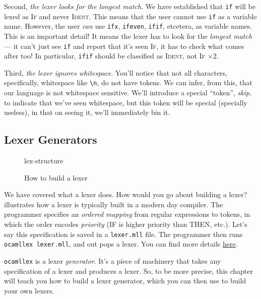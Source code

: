 Second, \emph{the lexer looks for the longest match}. We have established that \texttt{if} will be lexed as \textsc{If} and never \textsc{Ident}. This means that the user cannot use \texttt{if} as a variable name. However, the user \emph{can} use \texttt{ifx}, \texttt{ifeven}, \texttt{ifif}, etcetera, as variable names. This is an important detail! It means the lexer has to look for the \emph{longest match} --- it can't just see \texttt{if} and report that it's seen \textsc{If}, it has to check what comes after too! In particular, \texttt{ifif} should be classified as \textsc{Ident}, not \textsc{If} $\times 2$.

Third, \emph{the lexer ignores whitespace}. You'll notice that not all characters, specifically, whitespace like \verb|\n|, do not have tokens. We can infer, from this, that our language is not whitespace sensitive. We'll introduce a special ``token'', \emph{\sffamily skip}, to indicate that we've seen whitespace, but this token will be special (specially useless), in that on seeing it, we'll immediately bin it. 

\subsection{Lexer Generators}
\begin{figure}[H]
    \begin{center}
        {lex-structure}
    \end{center}
    \caption{How to build a lexer}
    \label{fig:build-lexer}
\end{figure}

We have covered what a lexer does. How would you go about building a lexer?  illustrates how a lexer is typically built in a modern day compiler. The programmer specifies an \emph{ordered mapping} from regular expressions to tokens, in which the order encodes \emph{priority} (\textsc{IF} is higher priority than \textsc{THEN}, etc.). Let's say this specification is saved in a \texttt{lexer.mll} file. The programmer then runs \texttt{ocamllex lexer.mll}, and out pops a lexer. You can find more details \hyperlink{https://ocaml.org/manual/5.2/lexyacc.html}{here}.

\texttt{ocamllex} is a lexer \emph{generator}. It's a piece of machinery that takes any specification of a lexer and produces a lexer. So, to be more precise, this chapter will teach you how to build a lexer generator, which you can then use to build your own lexers. 

